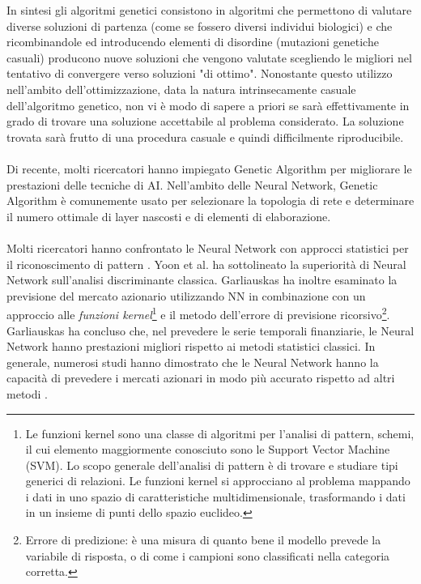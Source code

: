\documentclass[a4paper,12pt]{report}
\begin{document}
In sintesi gli algoritmi genetici consistono in algoritmi che permettono di valutare diverse soluzioni di partenza (come se fossero diversi individui biologici) e che ricombinandole  ed introducendo elementi di disordine (mutazioni genetiche casuali) producono nuove soluzioni che vengono valutate scegliendo le migliori nel tentativo di convergere verso soluzioni "di ottimo". Nonostante questo utilizzo nell'ambito dell'ottimizzazione, data la natura intrinsecamente casuale dell'algoritmo genetico, non vi è modo di sapere a priori se sarà effettivamente in grado di trovare una soluzione accettabile al problema considerato. La soluzione trovata sarà frutto di una procedura casuale e quindi difficilmente riproducibile. 
\\~\\
Di recente, molti ricercatori hanno impiegato Genetic Algorithm per migliorare le prestazioni delle tecniche di AI. Nell'ambito delle Neural Network, Genetic Algorithm  è comunemente usato per selezionare la topologia di rete e determinare il numero ottimale di layer nascosti e di elementi di elaborazione.\\~\\
Molti ricercatori hanno confrontato le Neural Network con approcci statistici per il riconoscimento di pattern \cite{nng}\cite{nns}. Yoon et al. \cite{nny} ha sottolineato la superiorità di Neural Network sull'analisi discriminante classica. Garliauskas \cite{nng} ha inoltre esaminato la previsione del mercato azionario utilizzando NN in combinazione con un approccio alle \textit{funzioni kernel}\footnote{Le funzioni kernel sono una classe di algoritmi per l'analisi di pattern, schemi, il cui elemento maggiormente conosciuto sono le Support Vector Machine (SVM). Lo scopo generale dell'analisi di pattern è di trovare e studiare tipi generici di relazioni. Le funzioni kernel si approcciano al problema mappando i dati in uno spazio di caratteristiche multidimensionale, trasformando i dati in un insieme di punti dello spazio euclideo.} e il metodo dell'errore di previsione ricorsivo\footnote{Errore di predizione: è una misura di quanto bene il modello prevede la variabile di risposta, o di come i campioni sono classificati nella categoria corretta.}.\\
Garliauskas \cite{nng} ha concluso che, nel prevedere le serie temporali finanziarie, le Neural Network hanno prestazioni migliori rispetto ai metodi statistici classici. In generale, numerosi studi hanno dimostrato che le Neural Network hanno la capacità di prevedere i mercati azionari in modo più accurato rispetto ad altri metodi \cite{nny}\cite{nnk}\cite{nnp}\cite{nns2}.
\end{document}
